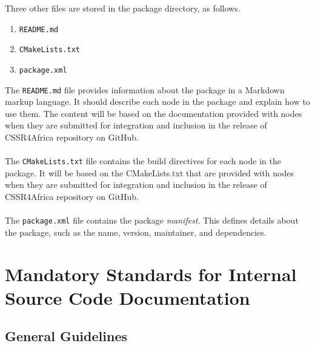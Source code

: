 \documentclass{CSSRforAfrica}
\newcommand{\blank}{~\\}
\begin{document}
\begin{appendices}
Three other files are stored in the package directory, as follows.
\begin{enumerate}
\item {\small \verb+README.md+} \vspace{-2mm}
\item {\small \verb+CMakeLists.txt+} \vspace{-2mm}
\item {\small \verb+package.xml+} 
\end{enumerate}
The {\small \verb+README.md+}  file  provides information about the package in a Markdown markup language. It should  describe each node in the package and explain how to use them.   The content will be based on the documentation provided with  nodes when they are submitted for integration and inclusion in the release of CSSR4Africa repository on GitHub. 
\blank
~
\blank
The {\small \verb+CMakeLists.txt+}  file contains the build directives for each node in the package.  It will be based on the CMakeLists.txt that are  provided with  nodes when they are submitted for integration and inclusion in the release of CSSR4Africa repository on GitHub. 
\blank
~
\blank
The  {\small \verb+package.xml+} file contains the package {\em manifest}. This defines details about the package, such as the name, version, maintainer, and dependencies.


\newpage 


\section{Mandatory Standards for Internal Source Code Documentation}
\label{appendix:documentation_standards}  
  
 \subsection{General Guidelines}


\end{appendices}
\end{document}
